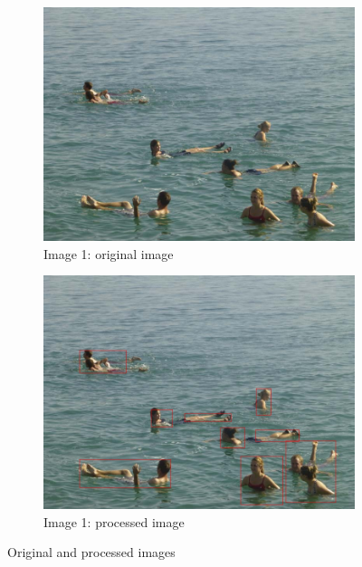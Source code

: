 \begin{figure}
        \centering
        \begin{subfigure}[h]{0.3\textwidth}
                \includegraphics[width=\textwidth]{Images/ocean7}
                \caption{Image 1: original image}
                \label{fig:original}
        \end{subfigure}%
        \quad
        \begin{subfigure}[h]{0.3\textwidth}
                \includegraphics[width=\textwidth]{Images/final}
                \caption{Image 1: processed image}
                \label{fig:final}
        \end{subfigure}
        \caption{Original and processed images}
\end{figure}

